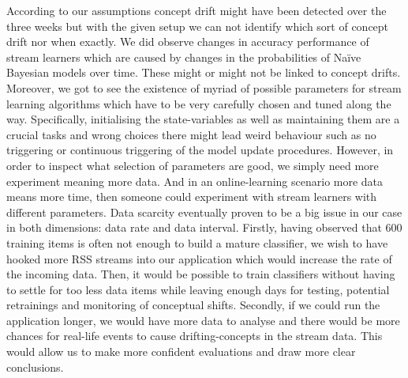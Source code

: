 \documentclass{article} %
\begin{document}
According to our assumptions concept drift might have been detected over the three weeks but with the given setup we can not identify which sort of concept drift nor when exactly. We did observe changes in accuracy performance of stream learners which are caused by changes in the probabilities of Na\"ive Bayesian models over time. These might or might not be linked to concept drifts. 
Moreover, we got to see the existence of myriad of possible parameters for stream learning algorithms which have to be very carefully chosen and tuned along the way. Specifically, initialising the state-variables as well as maintaining them are a crucial tasks and wrong choices there might lead weird behaviour such as no triggering or continuous triggering of the model update procedures. However, in order to inspect what selection of parameters are good, we simply need more experiment meaning more data. And in an online-learning scenario more data means more time, then someone could experiment with stream learners with different parameters. Data scarcity eventually proven to be a big issue in our case in both dimensions: data rate and data interval. Firstly, having observed that 600 training items is often not enough to build a mature classifier, we wish to have hooked more RSS streams into our application which would increase the rate of the incoming data. Then, it would be possible to train classifiers without having to settle for too less data items while leaving enough days for testing, potential retrainings and monitoring of conceptual shifts. Secondly, if we could run the application longer, we would have more data to analyse and there would be more chances for real-life events to cause drifting-concepts in the stream data. This would allow us to  make more confident evaluations and draw more clear conclusions.








\small{

}
\end{document}
